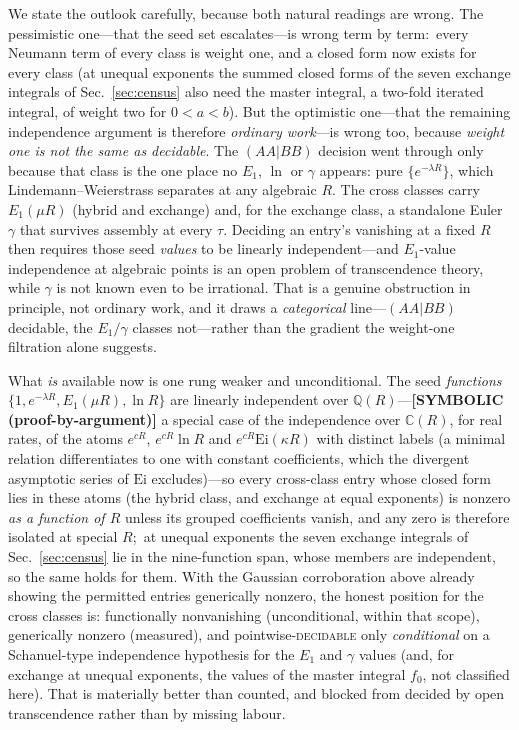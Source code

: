\documentclass[aps,pra,twocolumn,superscriptaddress,longbibliography]{revtex4-2}
\begin{document}
We state the outlook carefully, because both natural readings are wrong.
The pessimistic one---that the seed set escalates---is wrong term by term:\ every
Neumann term of every class is weight one, and a closed form now exists for every
class (at unequal exponents the summed closed forms of the seven exchange integrals of
Sec.~\ref{sec:census} also need the master integral, a two-fold iterated integral, of weight two for $0<a<b$).  But the optimistic one---that the remaining independence argument is
therefore \emph{ordinary work}---is wrong too, because \emph{weight one is
not the same as decidable}.  The $(AA|BB)$ decision went through only because
that class is the one place no $E_1$, $\ln$ or
$\gamma$ appears: pure $\{e^{-\lambda R}\}$, which Lindemann--Weierstrass
separates at any algebraic $R$.  The cross classes carry $E_1(\mu R)$ (hybrid
and exchange) and, for the exchange class, a standalone Euler $\gamma$ that
survives assembly at every $\tau$.  Deciding an entry's vanishing at a fixed
$R$ then requires those seed \emph{values} to be linearly independent---and
$E_1$-value independence at algebraic points is an open problem of
transcendence theory, while $\gamma$ is not known even to be irrational.
That is a genuine obstruction in principle, not ordinary work, and it draws
a \emph{categorical} line---$(AA|BB)$ decidable, the $E_1/\gamma$ classes
not---rather than the gradient the weight-one filtration alone suggests.

What \emph{is} available now is one rung weaker and unconditional.  The seed
\emph{functions} $\{1, e^{-\lambda R}, E_1(\mu R), \ln R\}$ are linearly
independent over $\mathbb{Q}(R)$---\textbf{[SYMBOLIC (proof-by-argument)]} a
special case of the independence over $\mathbb{C}(R)$, for real rates, of the atoms
$e^{cR}$, $e^{cR}\ln R$ and $e^{cR}\mathrm{Ei}(\kappa R)$ with distinct labels (a minimal relation
differentiates to one with constant coefficients, which the divergent asymptotic series of
$\mathrm{Ei}$ excludes)---so every cross-class entry whose closed form lies in these atoms
(the hybrid class, and exchange at equal exponents) is nonzero \emph{as a function of $R$}
unless its grouped coefficients vanish, and any zero is therefore isolated at
special $R$;\ at unequal exponents the seven exchange integrals of Sec.~\ref{sec:census} lie
in the nine-function span, whose members are independent, so the same holds for them.  With the Gaussian corroboration above already showing the
permitted entries generically nonzero, the honest position for the cross
classes is: functionally nonvanishing (unconditional, within that scope), generically nonzero
(measured), and pointwise-\textsc{decidable} only \emph{conditional} on a
Schanuel-type independence hypothesis for the $E_1$ and $\gamma$ values (and, for exchange at
unequal exponents, the values of the master integral $f_0$, not classified here).  That
is materially better than counted, and blocked from decided by open
transcendence rather than by missing labour.
\end{document}
